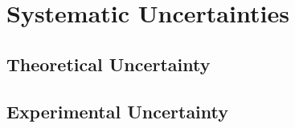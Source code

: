 \section{Systematic Uncertainties} 
	\subsection{Theoretical Uncertainty}
	\subsection{Experimental Uncertainty}
